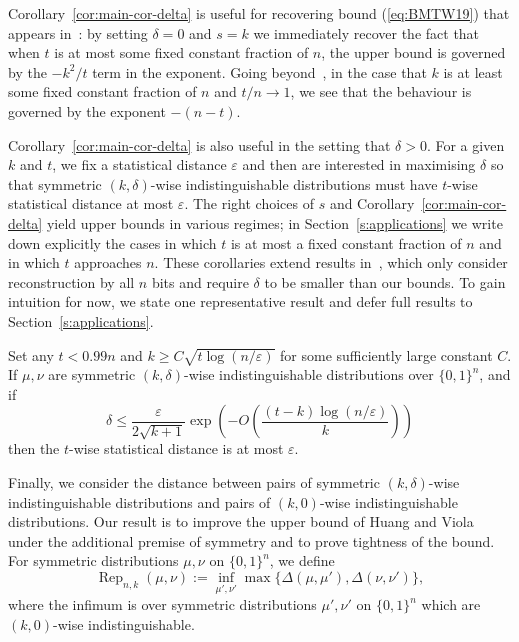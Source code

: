 \documentclass[manuscript,nonacm]{acmart}
\begin{document}
Corollary~\ref{cor:main-cor-delta} is useful for recovering bound (\ref{eq:BMTW19}) that appears in~\cite{bogdanov2019approximate}: by setting $\delta=0$ and $s=k$ we immediately recover the fact that when $t$ is at most some fixed constant fraction of $n$, the upper bound is governed by the $-k^2/t$ term in the exponent. Going beyond~\cite{bogdanov2019approximate}, in the case that $k$ is at least some fixed constant fraction of $n$ and $t/n\rightarrow 1$, we see that the behaviour is governed by the exponent $-(n-t)$.

Corollary~\ref{cor:main-cor-delta} is also useful in the setting that $\delta>0$. For a given $k$ and $t$, we fix a statistical distance $\varepsilon$ and then are interested in maximising $\delta$ so that symmetric $(k,\delta)$-wise indistinguishable distributions must have $t$-wise statistical distance at most $\varepsilon$. The right choices of $s$ and Corollary~\ref{cor:main-cor-delta} yield upper bounds in various regimes; in Section~\ref{s:applications} we write down explicitly the cases in which $t$ is at most a fixed constant fraction of $n$ and in which $t$ approaches $n$. These corollaries extend results in~\cite{huang2022approximate}, which only consider reconstruction by all $n$ bits and require $\delta$ to be smaller than our bounds. To gain intuition for now, we state one representative result and defer full results to Section~\ref{s:applications}.
\begin{corollary}
\label{cor:main_second_cor}
Set any $t<0.99n$ and $k\geq C\sqrt{t\log(n/\varepsilon)}$ for some sufficiently large constant $C$. If \(\mu,\nu\) are symmetric \((k,\delta)\)-wise indistinguishable distributions over \(\{0,1\}^n\), and if
\[
\delta
    \le
    \frac{\varepsilon}{2\sqrt{k+1}}
    \exp\!\left(
        -O\!\left(
            \frac{(t-k)\log(n/\varepsilon)}{k}
        \right)
    \right)
\]
then the $t$-wise statistical distance is at most $\varepsilon$.
\end{corollary}
Finally, we consider the distance between pairs of symmetric $(k,\delta)$-wise indistinguishable distributions and pairs of $(k,0)$-wise indistinguishable distributions. Our result is to improve the upper bound of Huang and Viola under the additional premise of symmetry and to prove tightness of the bound. 
For symmetric distributions \(\mu,\nu\) on \(\{0,1\}^n\), we define
\[
    \operatorname{Rep}_{n,k}(\mu,\nu)
    :=
    \inf_{\mu',\nu'}
    \max\{\Delta(\mu,\mu'),\Delta(\nu,\nu')\},
\]
where the infimum is over symmetric distributions \(\mu',\nu'\) on
\(\{0,1\}^n\) which are \((k,0)\)-wise indistinguishable.
\end{document}
